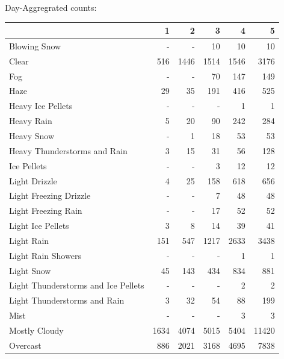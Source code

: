 \documentclass[11pt]{scrartcl}
\begin{document}
Day-Aggregrated counts:
\begin{tabular}{lrrrrr}
\toprule
{} &     1 &     2 &     3 &     4 &      5 \\
\midrule
Blowing Snow                        &   - &   - &    10 &    10 &     10 \\
Clear                               &   516 &  1446 &  1514 &  1546 &   3176 \\
Fog                                 &   - &   - &    70 &   147 &    149 \\
Haze                                &    29 &    35 &   191 &   416 &    525 \\
Heavy Ice Pellets                   &   - &   - &   - &     1 &      1 \\
Heavy Rain                          &     5 &    20 &    90 &   242 &    284 \\
Heavy Snow                          &   - &     1 &    18 &    53 &     53 \\
Heavy Thunderstorms and Rain        &     3 &    15 &    31 &    56 &    128 \\
Ice Pellets                         &   - &   - &     3 &    12 &     12 \\
Light Drizzle                       &     4 &    25 &   158 &   618 &    656 \\
Light Freezing Drizzle              &   - &   - &     7 &    48 &     48 \\
Light Freezing Rain                 &   - &   - &    17 &    52 &     52 \\
Light Ice Pellets                   &     3 &     8 &    14 &    39 &     41 \\
Light Rain                          &   151 &   547 &  1217 &  2633 &   3438 \\
Light Rain Showers                  &   - &   - &   - &     1 &      1 \\
Light Snow                          &    45 &   143 &   434 &   834 &    881 \\
Light Thunderstorms and Ice Pellets &   - &   - &   - &     2 &      2 \\
Light Thunderstorms and Rain        &     3 &    32 &    54 &    88 &    199 \\
Mist                                &   - &   - &   - &     3 &      3 \\
Mostly Cloudy                       &  1634 &  4074 &  5015 &  5404 &  11420 \\
Overcast                            &   886 &  2021 &  3168 &  4695 &   7838 \\

\end{tabular}
\end{document}
